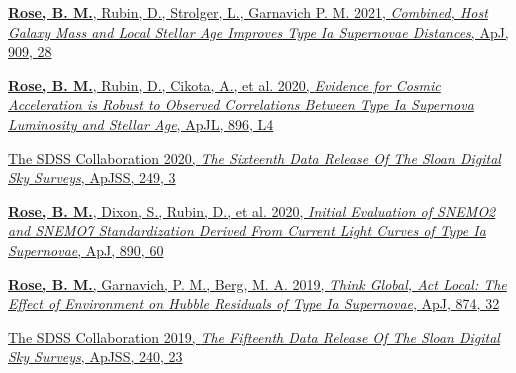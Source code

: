 \documentclass[margin]{res}
\begin{document}
\begin{resume}

\hangindent=15pt 
\href{https://ui.adsabs.harvard.edu/abs/2020arXiv201201460R/abstract}{{\bf Rose, B. M.}, Rubin, D., Strolger, L., Garnavich P. M. 2021, {\sl Combined, Host Galaxy Mass and Local Stellar Age Improves Type Ia Supernovae Distances}, ApJ, 909, 28} %
\vspace{-12pt}

\hangindent=15pt 
\href{https://ui.adsabs.harvard.edu/abs/2020ApJ...896L...4R/abstract}{{\bf Rose, B. M.}, Rubin, D., Cikota, A., et al. 2020, {\sl Evidence for Cosmic Acceleration is Robust to Observed Correlations Between Type Ia Supernova Luminosity and Stellar Age}, ApJL, 896, L4}
\vspace{-12pt}

\hangindent=15pt 
\href{https://ui.adsabs.harvard.edu/abs/2020ApJS..249....3A/abstract}{The SDSS Collaboration 2020, {\sl The Sixteenth Data Release Of The Sloan Digital Sky Surveys}, ApJSS, 249, 3}
\vspace{-12pt}


\hangindent=15pt
\href{https://ui.adsabs.harvard.edu/#abs/2019arXiv191209993R/abstract}{{\bf Rose, B. M.}, Dixon, S., Rubin, D., et al.  2020, {\sl Initial Evaluation of SNEMO2 and SNEMO7 Standardization Derived From Current Light Curves of Type Ia Supernovae}, ApJ, 890, 60} %
\vspace{-12pt}

\hangindent=15pt 
\href{https://ui.adsabs.harvard.edu/#abs/2019arXiv190201433R/abstract}{{\bf Rose, B. M.}, Garnavich, P. M., Berg, M. A. 2019, {\sl Think Global, Act Local: The Effect of Environment on Hubble Residuals of Type Ia Supernovae}, ApJ, 874, 32}
\vspace{-12pt}

\hangindent=15pt 
\href{https://ui.adsabs.harvard.edu/#abs/2018arXiv181202759A/abstract}{The SDSS Collaboration 2019, {\sl The Fifteenth Data Release Of The Sloan Digital Sky Surveys}, ApJSS, 240, 23}
\vspace{-12pt}


\end{resume}
\end{document}
